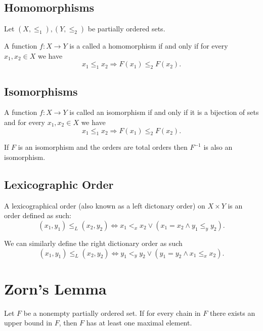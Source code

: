 \documentclass[11pt,a4paper]{article}
\begin{document}
\subsection{Homomorphisms}

Let $(X,\le_1) , (Y,\le_2)$ be partially ordered sets.

\begin{definition}[Homomorphism]
A function $f \colon X \to Y$ is a called a homomorphism
if and only if for every $x_1,x_2 \in X$ we have
\[
	x_1 \le_1 x_2 \Rightarrow F(x_1) \le_2 F(x_2).
\]
\end{definition}

\subsection{Isomorphisms}
\begin{definition}[Isomorphism]
A function $f \colon X \to Y$ is called an isomorphism 
if and only if it is a bijection of sets and for every $x_1,x_2 \in X$ we have
\[
	x_1 \le_1 x_2 \Rightarrow F(x_1) \le_2 F(x_2).
\]
\end{definition}

\begin{proposition}
  If $F$ is an isomorphism and the orders are 
  total orders then $F^{-1}$ is also an isomorphism.
\end{proposition}

\subsection{Lexicographic Order}
\begin{definition}
A lexicographical order (also known as a left dictonary order) on $X \times Y$
is an order defined as such:
\[
	(x_1,y_1) \le_L (x_2,y_2) 
	\iff 
	x_1 <_{x} x_2 \lor (x_1 = x_2 \land y_1 \le_{y} y_2).
\]
\end{definition}

\begin{remark}
  We can similarly define the right dictionary order as such
  \[
    (x_1,y_1) \le_L (x_2,y_2) 
    \iff 
    y_1 <_{y} y_2 \lor (y_1 = y_2 \land x_1 \le_{x} x_2).
  \]
\end{remark}

\newpage
\section{Zorn's Lemma}
\begin{lemma}
Let $F$ be a nonempty partially ordered set.
If for every chain in $F$ there exists an upper bound in $F$,
then $F$ has at least one maximal element.
\end{lemma}
\end{document}
